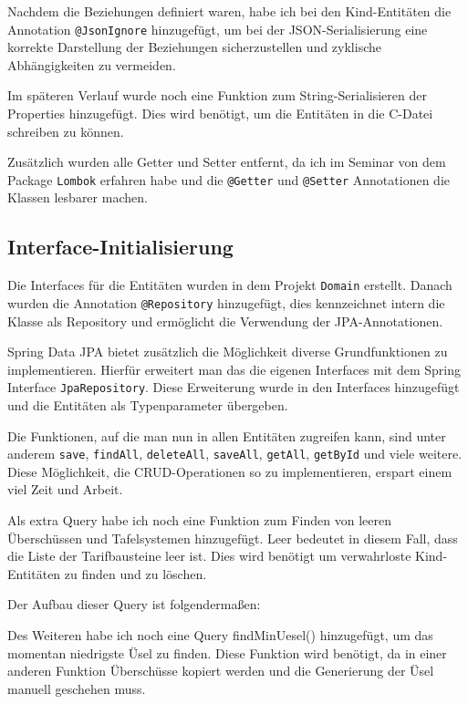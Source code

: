 Nachdem die Beziehungen definiert waren, habe ich bei den Kind-Entitäten die Annotation \texttt{@JsonIgnore} hinzugefügt, 
um bei der JSON-Serialisierung eine korrekte Darstellung der Beziehungen sicherzustellen und zyklische Abhängigkeiten zu vermeiden.

Im späteren Verlauf wurde noch eine Funktion zum String-Serialisieren der Properties hinzugefügt. Dies wird benötigt, um die Entitäten in die C-Datei schreiben zu können.

Zusätzlich wurden alle Getter und Setter entfernt, da ich im Seminar von dem Package \texttt{Lombok} erfahren habe und 
die \texttt{@Getter} und \texttt{@Setter} Annotationen die Klassen lesbarer machen.

\subsection{Interface-Initialisierung}
Die Interfaces für die Entitäten wurden in dem Projekt \texttt{Domain} erstellt. 
Danach wurden die Annotation \texttt{@Repository} hinzugefügt, dies kennzeichnet intern die Klasse als Repository und ermöglicht die Verwendung der JPA-Annotationen. 

Spring Data JPA bietet zusätzlich die Möglichkeit diverse Grundfunktionen zu implementieren. Hierfür erweitert man das die eigenen Interfaces mit dem Spring Interface \texttt{JpaRepository}. 
Diese Erweiterung wurde in den Interfaces hinzugefügt und die Entitäten als Typenparameter übergeben.

Die Funktionen, auf die man nun in allen Entitäten zugreifen kann, sind unter anderem \texttt{save}, \texttt{findAll}, \texttt{deleteAll}, \texttt{saveAll}, \texttt{getAll}, \texttt{getById} und viele weitere.
Diese Möglichkeit, die CRUD-Operationen so zu implementieren, erspart einem viel Zeit und Arbeit.

Als extra Query habe ich noch eine Funktion zum Finden von leeren Überschüssen und Tafelsystemen hinzugefügt. Leer bedeutet in diesem Fall, dass die Liste der Tarifbausteine leer ist.
Dies wird benötigt um verwahrloste Kind-Entitäten zu finden und zu löschen.

Der Aufbau dieser Query ist folgendermaßen:



Des Weiteren habe ich noch eine Query findMinUesel() hinzugefügt, um das momentan niedrigste Üsel zu finden.
Diese Funktion wird benötigt, da in einer anderen Funktion Überschüsse kopiert werden und die Generierung der Üsel 
manuell geschehen muss. 

